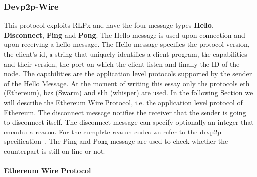 \subsubsection{Devp2p-Wire}
This protocol exploits RLPx and have the four message types 
\textbf{Hello}, \textbf{Disconnect}, \textbf{Ping} and \textbf{Pong}.
The Hello message is used upon connection and upon receiving a hello message.
The Hello message specifies the protocol version, the client's id,
a string that uniquely identifies a client program, the capabilities and their
version, the port on which the client listen and finally the ID of the node.
The capabilities are the application level protocols supported by the sender
of the Hello Message. At the moment of writing this essay only the protocols
eth (Ethereum), bzz (Swarm) and shh (whisper) are used. In the following
Section we will describe the Ethereum Wire Protocol, i.e. the application
level protocol of Ethereum.
The disconnect message notifies the receiver that the sender is going to
disconnect itself. The disconnect message can specify optionally an
integer that encodes a reason.
For the complete reason codes we refer to the devp2p specification~\cite{}.
The Ping and Pong message are used to check whether the counterpart is still
on-line or not.

\paragraph{Ethereum Wire Protocol}
